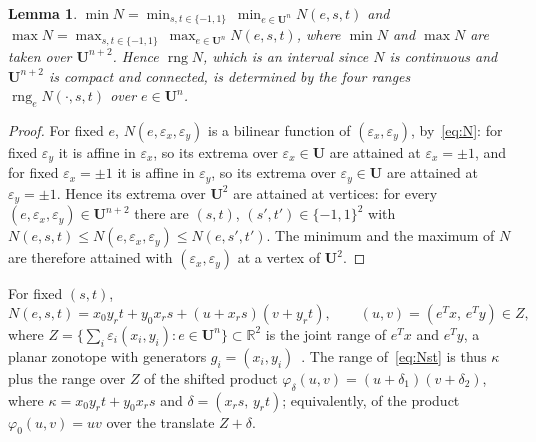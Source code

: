 \documentclass[11pt]{article}
\newtheorem{lemma}{Lemma}
\theoremstyle{definition}
\newcommand{\U}{\mathbf{U}}
\newcommand{\R}{\mathbb{R}}
\newcommand{\eps}{\varepsilon}
\newcommand{\ex}{\eps_x}
\newcommand{\ey}{\eps_y}
\newcommand{\rng}{\operatorname{rng}}
\begin{document}
\begin{lemma}
\label{lem:vertices}
$\min N = \min_{s,t\in\{-1,1\}}\ \min_{e\in\U^n} N(e,s,t)$ and $\max N = \max_{s,t\in\{-1,1\}}\ \max_{e\in\U^n} N(e,s,t)$, where $\min N$ and $\max N$ are taken over $\U^{n+2}$. Hence $\rng N$, which is an interval since $N$ is continuous and $\U^{n+2}$ is compact and connected, is determined by the four ranges $\rng_e N(\cdot,s,t)$ over $e\in\U^n$.
\end{lemma}
\begin{proof}
For fixed $e$, $N(e,\ex,\ey)$ is a bilinear function of $(\ex,\ey)$, by~\eqref{eq:N}: for fixed $\ey$ it is affine in $\ex$, so its extrema over $\ex\in\U$ are attained at $\ex=\pm1$, and for fixed $\ex=\pm1$ it is affine in $\ey$, so its extrema over $\ey\in\U$ are attained at $\ey=\pm1$. Hence its extrema over $\U^2$ are attained at vertices: for every $(e,\ex,\ey)\in\U^{n+2}$ there are $(s,t)$, $(s',t')\in\{-1,1\}^2$ with $N(e,s,t)\le N(e,\ex,\ey)\le N(e,s',t')$. The minimum and the maximum of $N$ are therefore attained with $(\ex,\ey)$ at a vertex of $\U^2$.
\end{proof}

For fixed $(s,t)$,
\begin{equation}
\label{eq:Nst}
N(e,s,t) = x_0y_rt+y_0x_rs + (u + x_rs)(v + y_rt),\qquad (u,v)=(e^Tx,\,e^Ty)\in Z,
\end{equation}
where $Z=\{\sum_i\eps_i(x_i,y_i): e\in\U^n\}\subset\R^2$ is the joint range of $e^Tx$ and $e^Ty$, a planar zonotope with generators $g_i=(x_i,y_i)$~\cite{ziegler1995lectures}. The range of~\eqref{eq:Nst} is thus $\kappa$ plus the range over $Z$ of the shifted product $\varphi_\delta(u,v)=(u+\delta_1)(v+\delta_2)$, where $\kappa=x_0y_rt+y_0x_rs$ and $\delta=(x_rs,\,y_rt)$; equivalently, of the product $\varphi_0(u,v)=uv$ over the translate $Z+\delta$.
\end{document}
